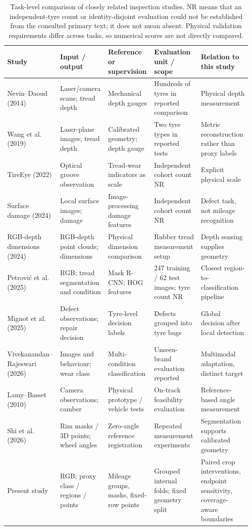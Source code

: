 \begin{table}[t]
\caption{Task-level comparison of closely related inspection studies. NR means that an independent-tyre count or identity-disjoint evaluation could not be established from the consulted primary text; it does not mean absent. Physical validation requirements differ across tasks, so numerical scores are not directly compared.}
\label{tab:related}
\centering\footnotesize
\setlength{\tabcolsep}{4pt}
\begin{tabularx}{\textwidth}{p{2.65cm}XXXX}
\toprule
Study & Input / output & Reference or supervision & Evaluation unit / scope & Relation to this study\\
\midrule
Nevin--Daoud (2014) \cite{laser2014} & Laser/camera scans; tread depth & Mechanical depth gauges & Hundreds of tyres in reported comparison & Physical depth measurement\\
Wang et al. (2019) \cite{depth2019} & Laser-plane images; tread depth & Calibrated geometry; depth gauge & Two tyre types in reported tests & Metric reconstruction rather than proxy labels\\
TireEye (2022) \cite{tireeye} & Optical groove observation & Tread-wear indicators as scale & Independent cohort count NR & Explicit physical scale\\
Surface damage (2024) \cite{damage2024} & Local surface images; damage & Image-processing damage features & Independent cohort count NR & Defect task, not mileage recognition\\
RGB-depth dimensions (2024) \cite{depth2024} & RGB-depth point clouds; dimensions & Physical dimension comparison & Rubber tread measurement setup & Depth sensing supplies geometry\\
Petrovi\'c et al. (2025) \cite{tread2025} & RGB; tread segmentation and condition & Mask R-CNN; HOG features & 247 training / 62 test images; tyre count NR & Closest region-to-classification pipeline\\
Mignot et al. (2025) \cite{mil2025} & Defect observations; repair decision & Tyre-level decision labels & Defects grouped into tyre bags & Global decision after local detection\\
Vivekanandan--Rajeswari (2026) \cite{edge2026} & Images and behaviour; wear class & Multi-condition classification & Unseen-brand evaluation reported & Multimodal adaptation, distinct target\\
Lamy--Basset (2010) \cite{camber2010} & Camera observations; camber & Physical prototype / vehicle tests & On-track feasibility evaluation & Reference-based angle measurement\\
Shi et al. (2026) \cite{alignment2026} & Rim masks / 3D points; wheel angles & Zero-angle reference registration & Repeated measurement experiments & Segmentation supports calibrated geometry\\
Present study & RGB; proxy class / regions / points & Mileage groups, masks, fixed-row points & Grouped internal folds; fixed geometry split & Paired crop interventions, endpoint sensitivity, coverage-aware boundaries\\
\bottomrule
\end{tabularx}
\end{table}
